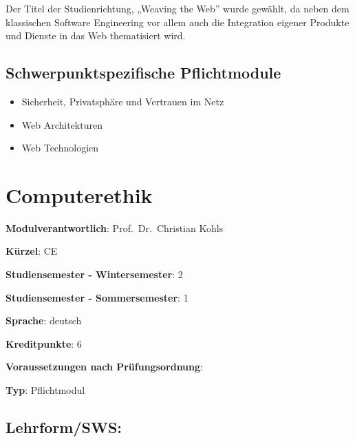 Der Titel der Studienrichtung, „Weaving the Web'' wurde gewählt, da
neben dem klassischen Software Engineering vor allem auch die
Integration eigener Produkte und Dienste in das Web thematisiert wird.

\section*{Schwerpunktspezifische
Pflichtmodule}\label{schwerpunktspezifische-pflichtmodule-4}

\begin{itemize}
\tightlist
\item
  Sicherheit, Privatsphäre und Vertrauen im Netz
\item
  Web Architekturen
\item
  Web Technologien
\end{itemize}

\chapter{Computerethik}\label{computerethik}

\begin{modulHead}
\textbf{Modulverantwortlich}: Prof.~Dr.~Christian
Kohls
\end{modulHead}
\begin{modulHead}
\textbf{Kürzel}:
CE
\end{modulHead}
\begin{modulHead}
\textbf{Studiensemester -
Wintersemester}:
2
\end{modulHead}
\begin{modulHead}
\textbf{Studiensemester -
Sommersemester}: 1
\end{modulHead}
\begin{modulHead}
\textbf{Sprache}:
deutsch
\end{modulHead}
\begin{modulHead}
\textbf{Kreditpunkte}:
6
\end{modulHead}
\begin{modulHead}
\textbf{Voraussetzungen nach
Prüfungsordnung}: 
\end{modulHead}
\begin{modulHead}
\textbf{Typ}:
Pflichtmodul
\end{modulHead}


\section*{Lehrform/SWS:}\label{lehrformsws}

